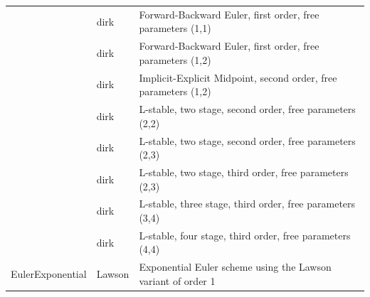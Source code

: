 \begin{center}
\begin{tabular}{p{2.5cm}p{4cm}p{8cm}}
               & dirk & Forward-Backward Euler, first order, free parameters (1,1)\\
               & dirk & Forward-Backward Euler, first order, free parameters (1,2)\\
               & dirk & Implicit-Explicit Midpoint, second order, free parameters (1,2)\\
               & dirk & L-stable, two stage, second order, free parameters (2,2)\\
               & dirk & L-stable, two stage, second order, free parameters (2,3)\\
               & dirk & L-stable, two stage, third order, free parameters (2,3)\\
               & dirk & L-stable, three stage, third order, free parameters (3,4)\\
               & dirk & L-stable, four stage, third order, free parameters (4,4)\\

EulerExponential & Lawson  & Exponential Euler scheme using the
                             Lawson variant of order 1 \\


\end{tabular}
\end{center}
